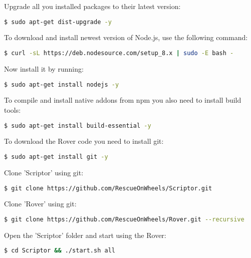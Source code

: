 Upgrade all you installed packages to their latest version:
\begin{lstlisting}[language=bash]
  $ sudo apt-get dist-upgrade -y
\end{lstlisting}

To download and install newest version of Node.js, use the following command:
\begin{lstlisting}[language=bash]
  $ curl -sL https://deb.nodesource.com/setup_8.x | sudo -E bash -
\end{lstlisting}

Now install it by running: 
\begin{lstlisting}[language=bash]
  $ sudo apt-get install nodejs -y
\end{lstlisting}

To compile and install native addons from npm you also need to install build tools: 
\begin{lstlisting}[language=bash]
  $ sudo apt-get install build-essential -y
\end{lstlisting}

To download the Rover code you need to install git: 
\begin{lstlisting}[language=bash]
  $ sudo apt-get install git -y
\end{lstlisting}

Clone 'Scriptor' using git: 
\begin{lstlisting}[language=bash]
  $ git clone https://github.com/RescueOnWheels/Scriptor.git
\end{lstlisting}

Clone 'Rover' using git: 
\begin{lstlisting}[language=bash]
  $ git clone https://github.com/RescueOnWheels/Rover.git --recursive
\end{lstlisting}

Open the 'Scriptor' folder and start using the Rover: 
\begin{lstlisting}[language=bash]
  $ cd Scriptor && ./start.sh all
\end{lstlisting}